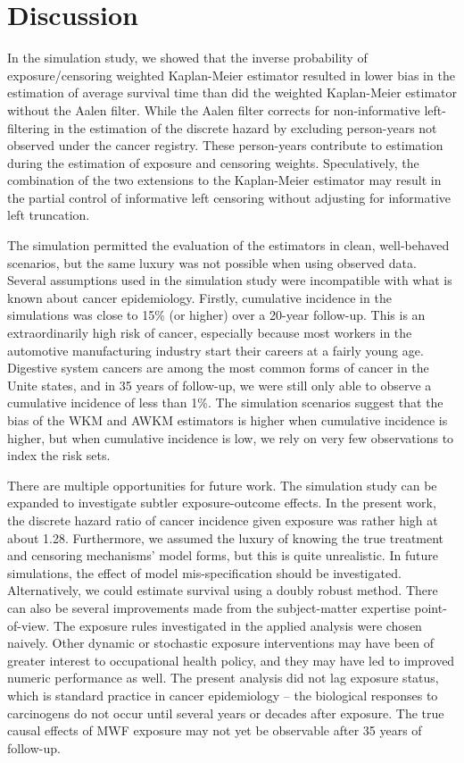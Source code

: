 \documentclass[
  11pt,
]{article}
\begin{document}
\hypertarget{discussion}{%
\section{Discussion}\label{discussion}}

In the simulation study, we showed that the inverse probability of
exposure/censoring weighted Kaplan-Meier estimator resulted in lower
bias in the estimation of average survival time than did the weighted
Kaplan-Meier estimator without the Aalen filter. While the Aalen filter
corrects for non-informative left-filtering in the estimation of the
discrete hazard by excluding person-years not observed under the cancer
registry. These person-years contribute to estimation during the
estimation of exposure and censoring weights. Speculatively, the
combination of the two extensions to the Kaplan-Meier estimator may
result in the partial control of informative left censoring without
adjusting for informative left truncation.

The simulation permitted the evaluation of the estimators in clean,
well-behaved scenarios, but the same luxury was not possible when using
observed data. Several assumptions used in the simulation study were
incompatible with what is known about cancer epidemiology. Firstly,
cumulative incidence in the simulations was close to 15\% (or higher)
over a 20-year follow-up. This is an extraordinarily high risk of
cancer, especially because most workers in the automotive manufacturing
industry start their careers at a fairly young age. Digestive system
cancers are among the most common forms of cancer in the Unite states,
and in 35 years of follow-up, we were still only able to observe a
cumulative incidence of less than 1\%. The simulation scenarios suggest
that the bias of the WKM and AWKM estimators is higher when cumulative
incidence is higher, but when cumulative incidence is low, we rely on
very few observations to index the risk sets.

There are multiple opportunities for future work. The simulation study
can be expanded to investigate subtler exposure-outcome effects. In the
present work, the discrete hazard ratio of cancer incidence given
exposure was rather high at about 1.28. Furthermore, we assumed the
luxury of knowing the true treatment and censoring mechanisms' model
forms, but this is quite unrealistic. In future simulations, the effect
of model mis-specification should be investigated. Alternatively, we
could estimate survival using a doubly robust method. There can also be
several improvements made from the subject-matter expertise
point-of-view. The exposure rules investigated in the applied analysis
were chosen naively. Other dynamic or stochastic exposure interventions
may have been of greater interest to occupational health policy, and
they may have led to improved numeric performance as well. The present
analysis did not lag exposure status, which is standard practice in
cancer epidemiology -- the biological responses to carcinogens do not
occur until several years or decades after exposure. The true causal
effects of MWF exposure may not yet be observable after 35 years of
follow-up.
\end{document}
